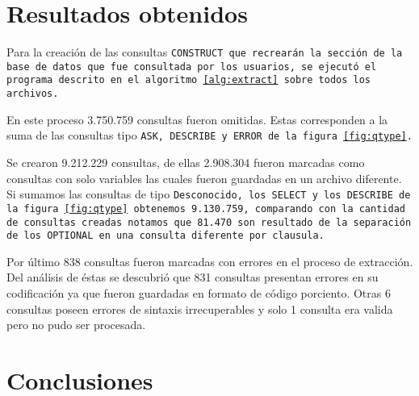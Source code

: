 
\section{Resultados obtenidos}\label{sec:res}
Para la creación de las consultas \tt{CONSTRUCT} que recrearán la sección de la
base de datos que fue consultada por los usuarios, se ejecutó el programa
descrito en el algoritmo~\ref{alg:extract} sobre todos los archivos.

En este proceso 3.750.759 consultas fueron omitidas. Estas corresponden a la
suma de las consultas tipo \tt{ASK}, \tt{DESCRIBE} y \tt{ERROR} de la
figura~\ref{fig:qtype}.

Se crearon 9.212.229 consultas, de ellas 2.908.304 fueron marcadas como
consultas con solo variables las cuales fueron guardadas en un archivo
diferente. Si sumamos las consultas de tipo \tt{Desconocido}, los \tt{SELECT} y
los \tt{DESCRIBE} de la figura~\ref{fig:qtype} obtenemos 9.130.759, comparando
con la cantidad de consultas creadas notamos que 81.470 son resultado de la
separación de los \tt{OPTIONAL} en una consulta diferente por clausula.

Por último 838 consultas fueron marcadas con errores en el proceso de
extracción. 
Del análisis de éstas se descubrió que 831 consultas presentan errores en su
codificación ya que fueron guardadas en formato de código porciento. Otras 6
consultas poseen errores de sintaxis irrecuperables y solo 1 consulta era
valida pero no pudo ser procesada.


\section{Conclusiones}\label{sec:con}
